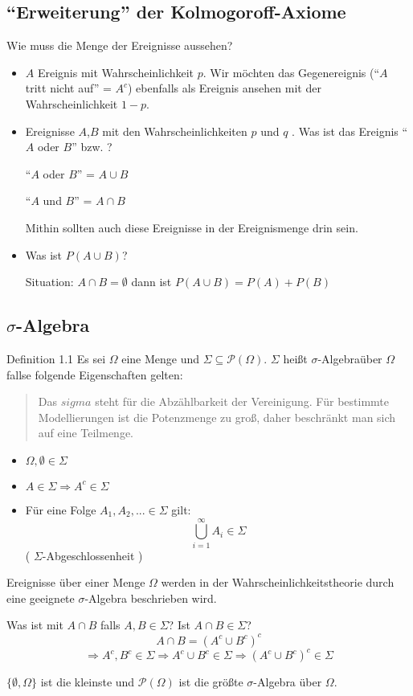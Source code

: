 \subsection{``Erweiterung'' der Kolmogoroff-Axiome}

Wie muss die Menge der Ereignisse aussehen?
\begin{itemize}
 \item $A$ Ereignis mit Wahrscheinlichkeit $p$. Wir möchten das Gegenereignis (``$A$ tritt nicht auf'' = $A^c$) ebenfalls als Ereignis ansehen mit der Wahrscheinlichkeit $1-p$.
 \item Ereignisse $A$,$B$ mit den Wahrscheinlichkeiten $p$ und $q$ . Was ist das Ereignis ``$A$ oder $B$'' bzw. ?

 ``$A$ oder $B$'' = $A \cup B$

 ``$A$ und $B$'' = $A \cap B$

 Mithin sollten auch diese Ereignisse in der Ereignismenge drin sein.
 \item Was ist $P(A \cup B)$?

Situation: $A \cap B = \emptyset$ dann ist $P(A \cup B) = P(A) + P(B)$

\end{itemize}
\subsection{$\sigma$-Algebra}
Definition 1.1 Es sei $\Omega$ eine Menge und $\Sigma \subseteq \mathcal P(\Omega)$. $\Sigma$ heißt $\sigma$-Algebraüber $\Omega$ fallse folgende Eigenschaften gelten:
\begin{quote}
 Das $sigma$ steht für die Abzählbarkeit der Vereinigung. Für bestimmte Modellierungen ist die Potenzmenge zu groß, daher beschränkt man sich auf eine Teilmenge.
\end{quote}

\begin{itemize}
 \item $\Omega, \emptyset \in \Sigma$
 \item $A \in \Sigma \Rightarrow A^c \in \Sigma$
 \item Für eine Folge $A_1,A_2,... \in \Sigma$ gilt:
$$ \bigcup_{i=1}^\infty A_i \in \Sigma$$ ( $\Sigma$-Abgeschlossenheit )
\end{itemize}
Ereignisse über einer Menge $\Omega$ werden in der Wahrscheinlichkeitstheorie durch eine geeignete $\sigma$-Algebra beschrieben wird.

Was ist mit $A \cap B$ falls $A,B \in \Sigma$? Ist $A \cap B \in \Sigma$?
$$ A \cap B = (A^c \cup B^c)^c$$
$$ \Rightarrow A^c, B^c \in \Sigma \Rightarrow A^c \cup B^c \in \Sigma \Rightarrow (A^c \cup B^c)^c \in \Sigma $$

$\{\emptyset, \Omega\}$ ist die kleinste und $\mathcal P(\Omega)$ ist die größte $\sigma$-Algebra über $\Omega$.

